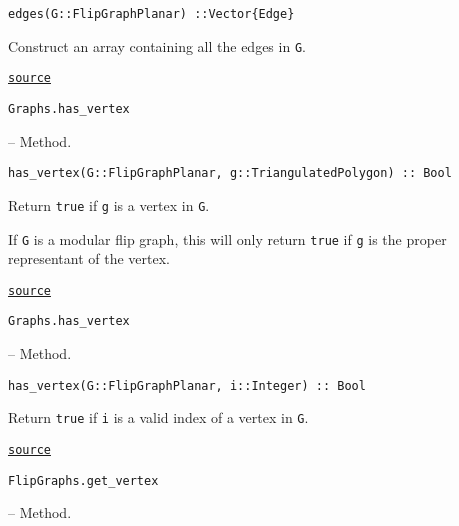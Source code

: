 \begin{adjustwidth}{2em}{0pt}


\begin{verbatim}
edges(G::FlipGraphPlanar) ::Vector{Edge}
\end{verbatim}

Construct an array containing all the edges in \texttt{G}.



\href{https://github.com/schto223/FlipGraphs.jl/blob/e35d43698a06b86273148826b79d585ba04fcd26/src/flipGraphPlanar.jl#L24-L28}{\texttt{source}}


\end{adjustwidth}
\hypertarget{6073231109657752490}{\texttt{Graphs.has\_vertex}}  -- {Method.}

\begin{adjustwidth}{2em}{0pt}


\begin{verbatim}
has_vertex(G::FlipGraphPlanar, g::TriangulatedPolygon) :: Bool
\end{verbatim}

Return \texttt{true} if \texttt{g} is a vertex in \texttt{G}. 

If \texttt{G} is a modular flip graph, this will only return \texttt{true} if \texttt{g} is the proper representant of the vertex.



\href{https://github.com/schto223/FlipGraphs.jl/blob/e35d43698a06b86273148826b79d585ba04fcd26/src/flipGraphPlanar.jl#L57-L63}{\texttt{source}}


\end{adjustwidth}
\hypertarget{11632110415817252502}{\texttt{Graphs.has\_vertex}}  -- {Method.}

\begin{adjustwidth}{2em}{0pt}


\begin{verbatim}
has_vertex(G::FlipGraphPlanar, i::Integer) :: Bool
\end{verbatim}

Return \texttt{true} if \texttt{i} is a valid index of a vertex in \texttt{G}.



\href{https://github.com/schto223/FlipGraphs.jl/blob/e35d43698a06b86273148826b79d585ba04fcd26/src/flipGraphPlanar.jl#L50-L54}{\texttt{source}}


\end{adjustwidth}
\hypertarget{2888131517601982711}{\texttt{FlipGraphs.get\_vertex}}  -- {Method.}


